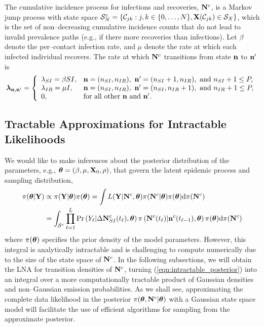The cumulative incidence process for infections and recoveries, $ \mathbf{N}^c $, is a Markov jump process with state space $ \mathcal{S}_N^c = \left \lbrace \mathcal{C}_{jk}:j,k\in\lbrace0,\dots,N\rbrace,\mathbf{X}(\mathcal{C}_{jk}) \in \mathcal{S}_X\right \rbrace $, which is the set of non--decreasing cumulative incidence counts that do not lead to invalid prevalence paths (e.g., if there more recoveries than infections). Let $ \beta $ denote the per--contact infection rate, and $ \mu $ denote the rate at which each infected individual recovers. The rate at which $ \mathbf{N}^c $ transitions from state $ \mathbf{n} $ to $ \mathbf{n}^{\prime}$ is 
\begin{equation}
	\label{eqn:lna_sir_rates}
	\boldsymbol{\lambda}_{\mathbf{n},\mathbf{n}^\prime} = \left \lbrace \begin{array}{ll}
	\lambda_{SI} = \beta S I, & \mathbf{n} = (n_{SI},n_{IR}),\ \mathbf{n}^\prime = (n_{SI}+1,n_{IR}),\text{ and } n_{SI}+1\leq P, \\
	 \lambda_{IR} = \mu I, &  \mathbf{n} = (n_{SI},n_{IR}),\  \mathbf{n}^\prime = (n_{SI},n_{IR}+1),\text{ and } n_{IR}+1\leq P, \\
	 0, & \text{for all other } \mathbf{n} \text{ and } \mathbf{n}^\prime.
	\end{array} \right.
\end{equation}

\subsection{Tractable Approximations for Intractable Likelihoods}
\label{subsec:lna_motivation}
We would like to make inferences about the posterior distribution of the parameters, e.g., $ \boldsymbol{\theta} = (\beta, \mu, \mathbf{X}_0, \rho)$, that govern the latent epidemic process and sampling distribution, 
\begin{align}
\label{eqn:intractable_posterior}
 \pi(\boldsymbol{\theta}|\mathbf{Y})&\propto \pi(\mathbf{Y}|\boldsymbol{\theta})\pi(\boldsymbol{\theta}) = \int L(\mathbf{Y}|\mathbf{N}^c,\boldsymbol{\theta})\pi(\mathbf{N}^c|\boldsymbol{\theta})\pi(\boldsymbol{\theta})\mathrm{d}\pi(\mathbf{N}^c)\nonumber\\
 &= \int_{\mathcal{S}^c}\prod_{\ell=1}^L \Pr\left (Y_\ell|\Delta\mathbf{N}_{SI}^c(t_\ell),\boldsymbol{\theta}\right )\pi\left (\mathbf{N}^c(t_\ell)|\mathbf{n}^c(t_{\ell-1}),\boldsymbol{\theta}\right )\pi(\boldsymbol{\theta})\mathrm{d}\pi(\mathbf{N}^c)
\end{align}
where $ \pi(\boldsymbol{\theta}) $ specifies the prior density of the model parameters. However, this integral is analytically intractable and is challenging to compute numerically due to the size of the state space of $ \mathbf{N}^c $. In the following subsections, we will obtain the LNA for transition densities of $ \mathbf{N}^c $, turning (\ref{eqn:intractable_posterior}) into an integral over a more computationally tractable product of Gaussian densities and non--Gaussian emission probabilities. As we shall see, approximating the complete data likelihood in the posterior $ \pi(\boldsymbol{\theta},\mathbf{N}^c|\boldsymbol{\theta}) $ with a Gaussian state space model will facilitate the use of efficient algorithms for sampling from the approximate posterior. 

